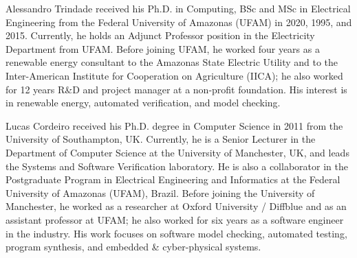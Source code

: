 \documentclass[journal]{IEEEtran}
\begin{document}
\begin{IEEEbiography}
    {Alessandro Trindade}
received his Ph.D. in Computing, BSc and MSc in Electrical Engineering from the Federal University of Amazonas (UFAM) in 2020, 1995, and 2015. Currently, he holds an Adjunct Professor position in the Electricity Department from UFAM. Before joining UFAM, he worked four years as a renewable energy consultant to the Amazonas State Electric Utility and to the Inter-American Institute for Cooperation on Agriculture (IICA); he also worked for 12 years R\&D and project manager at a non-profit foundation. His interest is in renewable energy, automated verification, and model checking.
\end{IEEEbiography}

\begin{IEEEbiography}
    {Lucas Cordeiro}
received his Ph.D. degree in Computer Science in 2011 from the University of Southampton, UK. Currently, he is a Senior Lecturer in the Department of Computer Science at the University of Manchester, UK, and leads the Systems and Software Verification laboratory. He is also a collaborator in the Postgraduate Program in Electrical Engineering and Informatics at the Federal University of Amazonas (UFAM), Brazil. Before joining the University of Manchester, he worked as a researcher at Oxford University / Diffblue and as an assistant professor at UFAM; he also worked for six years as a software engineer in the industry. His work focuses on software model checking, automated testing, program synthesis, and embedded \& cyber-physical systems.
\end{IEEEbiography}
\end{document}
